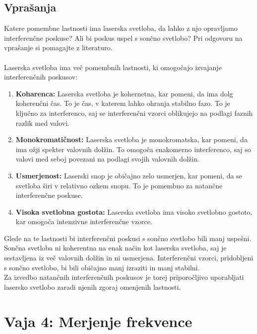 \documentclass{report}
\begin{document}
\section{Vprašanja}
Katere pomembne lastnosti ima laserska svetloba, da lahko z njo opravljamo interferenčne
poskuse? Ali bi poskus uspel s sončno svetlobo? Pri odgovoru na vprašanje si pomagajte
z literaturo.\\\\

\noindent Laserska svetloba ima več pomembnih lastnosti, ki omogočajo izvajanje interferenčnih poskusov:

\begin{enumerate}
    \item \textbf{Koharenca:} Laserska svetloba je kohernetna, kar pomeni, da ima dolg koherenčni čas. To je čas, v katerem lahko ohranja stabilno fazo. To je ključno za interferenco, saj se interferenčni vzorci oblikujejo na podlagi faznih razlik med valovi.
    
    \item \textbf{Monokromatičnost:} Laserska svetloba je monokromatska, kar pomeni, da ima ožji spekter valovnih dolžin. To omogoča enakomerno interferenco, saj so valovi med seboj povezani na podlagi svojih valovnih dolžin.
    
    \item \textbf{Usmerjenost:} Laserski snop je običajno zelo usmerjen, kar pomeni, da se svetloba širi v relativno ozkem snopu. To je pomembno za natančne interferenčne poskuse.
    
    \item \textbf{Visoka svetlobna gostota:} Laserska svetloba ima visoko svetlobno gostoto, kar omogoča intenzivne interferenčne vzorce.
\end{enumerate}
Glede na te lastnosti bi interferenčni poskusi s sončno svetlobo bili manj uspešni. Sončna svetloba ni koherentna na enak način kot laserska svetloba, saj je sestavljena iz več valovnih dolžin in ni usmerjena. Interferenčni vzorci, pridobljeni s sončno svetlobo, bi bili običajno manj izraziti in manj stabilni.\\
Za izvedbo natančnih interferenčnih poskusov je torej priporočljivo uporabljati lasersko svetlobo zaradi njenih zgoraj omenjenih lastnosti.



\chapter{Vaja 4: Merjenje frekvence}
\end{document}
